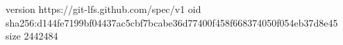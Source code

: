 version https://git-lfs.github.com/spec/v1
oid sha256:d144fe7199bf04437ac5cbf7bcabe36d77400f458f668374050f054eb37d8e45
size 2442484
